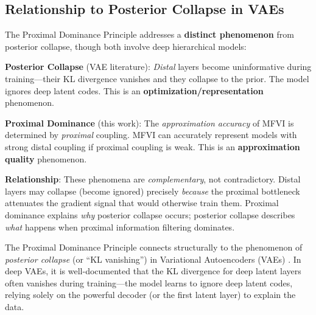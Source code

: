 \documentclass[10pt]{article} %
\theoremstyle{plain}
\theoremstyle{definition}
\begin{document}
\subsection{Relationship to Posterior Collapse in VAEs}

\begin{tcolorbox}[breakable, colback=red!5, colframe=red!50!black, title=\textbf{Critical Distinction: Proximal Dominance vs. Posterior Collapse}, fonttitle=\bfseries]
The Proximal Dominance Principle addresses a \textbf{distinct phenomenon} from posterior collapse, though both involve deep hierarchical models:

\textbf{Posterior Collapse} (VAE literature): \emph{Distal} layers become uninformative during training---their KL divergence vanishes and they collapse to the prior. The model ignores deep latent codes. This is an \textbf{optimization/representation} phenomenon.

\textbf{Proximal Dominance} (this work): The \emph{approximation accuracy} of MFVI is determined by \emph{proximal} coupling. MFVI can accurately represent models with strong distal coupling if proximal coupling is weak. This is an \textbf{approximation quality} phenomenon.

\textbf{Relationship}: These phenomena are \emph{complementary}, not contradictory. Distal layers may collapse (become ignored) precisely \emph{because} the proximal bottleneck attenuates the gradient signal that would otherwise train them. Proximal dominance explains \emph{why} posterior collapse occurs; posterior collapse describes \emph{what} happens when proximal information filtering dominates.
\end{tcolorbox}

The Proximal Dominance Principle connects structurally to the phenomenon of \emph{posterior collapse} (or ``KL vanishing'') in Variational Autoencoders (VAEs) \citep{bowman2016generating,alemi2018fixing,he2019lagging,lucas2019understanding}. In deep VAEs, it is well-documented that the KL divergence for deep latent layers often vanishes during training---the model learns to ignore deep latent codes, relying solely on the powerful decoder (or the first latent layer) to explain the data.
\end{document}
